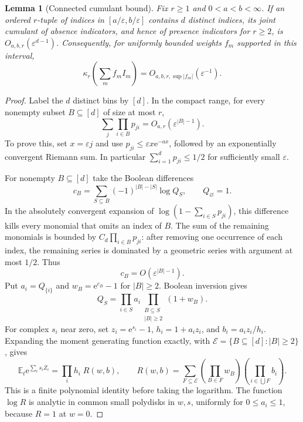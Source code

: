 \documentclass[11pt,letterpaper]{article}
\numberwithin{equation}{section}
\newtheorem{lemma}[theorem]{Lemma}
\theoremstyle{definition}\newtheorem{definition}[theorem]{Definition}
\theoremstyle{remark}\newtheorem{remark}[theorem]{Remark}
\newcommand{\E}{\mathbb E}
\newcommand{\ee}{\mathrm e}
\newcommand{\eps}{\varepsilon}
\begin{document}
\begin{lemma}[Connected cumulant bound]\label{dmv:fl:lem:cumulants}
Fix $r\ge1$ and $0<a<b<\infty$. If an ordered $r$-tuple of indices
in $[a/\eps,b/\eps]$ contains $d$ distinct indices, its joint cumulant
of absence indicators, and hence of presence indicators for $r\ge2$,
is $O_{a,b,r}(\eps^{d-1})$. Consequently, for uniformly bounded weights
$f_m$ supported in this interval,
\begin{equation}\label{dmv:fl:eq:sumcumulants}
 \kappa_r\left(\sum_m f_m I_m\right)=O_{a,b,r,\sup|f_m|}(\eps^{-1}).
\end{equation}
\end{lemma}
\begin{proof}
Label the $d$ distinct bins by $[d]$. In the compact range, for every
nonempty subset $B\subseteq[d]$ of size at most $r$,
\begin{equation}\label{dmv:fl:eq:rowproducts}
 \sum_j\prod_{i\in B}p_{ji}=O_{a,r}(\eps^{|B|-1}).
\end{equation}
To prove this, set $x=\eps j$ and use
$p_{ji}\le\eps x\ee^{-ax}$, followed by an exponentially convergent
Riemann sum. In particular $\sum_{i=1}^dp_{ji}\le1/2$ for sufficiently
small $\eps$.

For nonempty $B\subseteq[d]$ take the Boolean differences
\[
 c_B=\sum_{S\subseteq B}(-1)^{|B|-|S|}\log Q_S,
 \qquad Q_\varnothing=1.
\]
In the absolutely convergent expansion of
$\log(1-\sum_{i\in S}p_{ji})$, this difference kills every monomial
that omits an index of $B$. The sum of the remaining monomials is
bounded by $C_d\prod_{i\in B}p_{ji}$: after removing one occurrence of
each index, the remaining series is dominated by a geometric series
with argument at most $1/2$. Thus
\begin{equation}\label{dmv:fl:eq:hyperweights}
 c_B=O(\eps^{|B|-1}).
\end{equation}
Put $a_i=Q_{\{i\}}$ and $w_B=\ee^{c_B}-1$ for $|B|\ge2$.
Boolean inversion gives
\[
 Q_S=\prod_{i\in S}a_i
     \prod_{\substack{B\subseteq S\\|B|\ge2}}(1+w_B).
\]
For complex $s_i$ near zero, set
$z_i=\ee^{s_i}-1$, $h_i=1+a_iz_i$, and $b_i=a_iz_i/h_i$.
Expanding the moment generating function exactly, with
$\mathcal E=\{B\subseteq[d]:|B|\ge2\}$, gives
\begin{equation}\label{dmv:fl:eq:finitecluster}
 \E_t\ee^{\sum_i s_iZ_i}
 =\prod_i h_i\;R(w,b),\qquad
 R(w,b)=\sum_{F\subseteq\mathcal E}
       \left(\prod_{B\in F}w_B\right)
       \left(\prod_{i\in\bigcup F}b_i\right).
\end{equation}
This is a finite polynomial identity before taking the logarithm.
The function $\log R$ is analytic in common small polydisks in $w,s$,
uniformly for $0\le a_i\le1$, because $R=1$ at $w=0$.


\end{proof}
\end{document}
